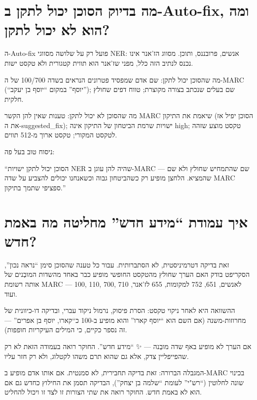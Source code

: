 \documentclass[12pt,a4paper]{article}
\begin{document}
\section{\texthebrew{מה בדיוק הסוכן יכול לתקן ב-Auto-fix, ומה הוא לא יכול לתקן?}}
\begin{hebrew}
ה-Auto-fix פועל רק על שלושה מסווגי NER: אנשים, פרובננס, ותוכן. מסווג הז'אנר אינו נכנס לנתיב הזה כלל, מפני שז'אנר הוא תווית קטגורית ולא טקסט ישות.
\par
מה שהסוכן יכול לתקן: שם אדם שמפסיד פטרונים הנראים בשדה 100/700 של ה-MARC (``יוסף'' במקום ``יוסף בן יעקב''); שם בעלים שנכתב בצורה מקוצרת; טווח דפים שחולץ חלקית.
\par
מה שהסוכן לא יכול לתקן: טענות שאין להן הקשר MARC שיאמת את התיקון (הסוכן יפיל אז את ה-\textenglish{suggested\_fix}); ישויות שרמת הביטחון של התיקון אינה \textenglish{high}; טקסט מוצע שזהה לטקסט המקורי; טקסט ארוך מ-512 תווים.
\par
ניסוח טוב בעל פה:
\par
``הסוכן יכול לתקן ישויות NER שהיה להן עוגן ב-MARC --- שם שהתמחיש שחולץ ולא שם שהמציא. הלחצן מופיע רק כשהביטחון גבוה וכשאנחנו יכולים להצביע על שדה MARC ספציפי שתמך בתיקון.''
\end{hebrew}


\section{\texthebrew{איך עמודת ``מידע חדש'' מחליטה מה באמת חדש?}}
\begin{hebrew}
זאת בדיקה דטרמיניסטית, לא הסתברותית. עבור כל טענה שהסוכן סימן ``נראה נכון'', הסקריפט בודק האם הערך שחולץ מהטקסט החופשי מופיע כבר באחד מהשדות המובְנים של אותה רשומת MARC --- 100, 110, 700, 710 לאנשים, 651, 752 למקומות, 655 לז'אנר, ועוד.
\par
ההשוואה היא לאחר ניקוי טקסט: הסרת פיסוק, נרמול ניקוד עברי, ובדיקה דו-כיוונית של מחרוזות-משנה (אם השם הוא ``יוסף קארו'' והוא מופיע ב-100 כ``קארו, יוסף בן אפרים'' --- זה נספר כקיים, כי המילים העיקריות חופפות).
\par
אם הערך לא מופיע באף שדה מובְנה --- ✨ ``מידע חדש''. החוקר רואה בעמודה הזאת לא רק שהפייפליין צדק, אלא גם שהוא תרם משהו לקטלוג, ולא רק חזר עליו.
\par
המגבלה הברורה: זאת בדיקה תחבירית, לא סמנטית. אם אותו אדם מופיע ב-MARC בכינוי שונה לחלוטין (``רש"י'' לעומת ``שלמה בן יצחק''), הבדיקה תסמן את החילוץ כחדש גם אם הוא לא באמת חדש. החוקר רואה את שתי הצורות זו לצד זו ויכול להחליט.
\end{hebrew}
\end{document}

